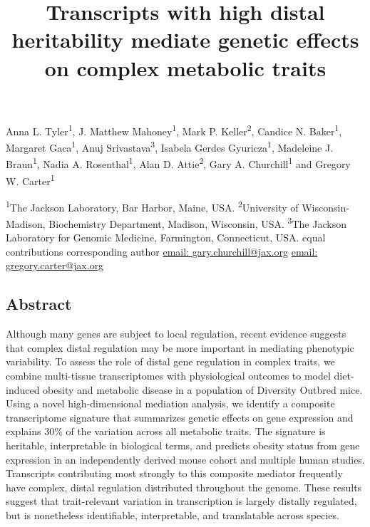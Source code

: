 \documentclass[
]{article}
\title{Transcripts with high distal heritability mediate genetic effects
on complex metabolic traits}
\author{}
\date{\vspace{-2.5em}}
\begin{document}
\maketitle

Anna L. Tyler\textsuperscript{1}\text{*}, J. Matthew
Mahoney\textsuperscript{1}\text{*}, Mark P. Keller\textsuperscript{2},
Candice N. Baker\textsuperscript{1}, Margaret Gaca\textsuperscript{1},
Anuj Srivastava\textsuperscript{3}, Isabela Gerdes
Gyuricza\textsuperscript{1}, Madeleine J. Braun\textsuperscript{1},
Nadia A. Rosenthal\textsuperscript{1}, Alan D. Attie\textsuperscript{2},
Gary A.
Churchill\textsuperscript{1}\textsuperscript{\textdagger}\textsuperscript{\Letter}
and Gregory W.
Carter\textsuperscript{1}\textsuperscript{\textdagger}\textsuperscript{\Letter}

\textsuperscript{1}The Jackson Laboratory, Bar Harbor, Maine, USA.
\textsuperscript{2}University of Wisconsin-Madison, Biochemistry
Department, Madison, Wisconsin, USA. \textsuperscript{3}The Jackson
Laboratory for Genomic Medicine, Farmington, Connecticut, USA.
\text{*}equal contributions \textsuperscript{\textdagger} corresponding
author
\textsuperscript{\Letter}\href{mailto:gary.churchill@jax.org}{email: gary.churchill@jax.org}
\textsuperscript{\Letter}\href{mailto:gregory.carter@jax.org}{email: gregory.carter@jax.org}

\subsection{Abstract}\label{abstract}

Although many genes are subject to local regulation, recent evidence
suggests that complex distal regulation may be more important in
mediating phenotypic variability. To assess the role of distal gene
regulation in complex traits, we combine multi-tissue transcriptomes
with physiological outcomes to model diet-induced obesity and metabolic
disease in a population of Diversity Outbred mice. Using a novel
high-dimensional mediation analysis, we identify a composite
transcriptome signature that summarizes genetic effects on gene
expression and explains 30\% of the variation across all metabolic
traits. The signature is heritable, interpretable in biological terms,
and predicts obesity status from gene expression in an independently
derived mouse cohort and multiple human studies. Transcripts
contributing most strongly to this composite mediator frequently have
complex, distal regulation distributed throughout the genome. These
results suggest that trait-relevant variation in transcription is
largely distally regulated, but is nonetheless identifiable,
interpretable, and translatable across species.
\end{document}
